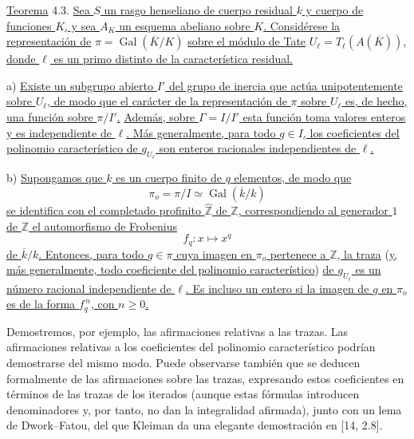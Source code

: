 \par\medskip
\noindent
\underline{Teorema} 4.3. \underline{Sea $S$ un rasgo henseliano de
cuerpo residual $k$ y cuerpo de funciones $K$, y sea $A_K$ un esquema
abeliano sobre $K$. Considérese la representación de}
$\pi=\operatorname{Gal}(\overline K/K)$ \underline{sobre el módulo de
Tate} $U_\ell=T_\ell(A(\overline K))$, \underline{donde $\ell$ es un
primo distinto de la característica residual.}

\smallskip
\noindent
a) \underline{Existe un subgrupo abierto $I'$ del grupo de inercia que
actúa unipotentemente sobre $U_\ell$, de modo que el carácter de la
representación de $\pi$ sobre $U_\ell$ es, de hecho, una función sobre
$\pi/I'$.}
\underline{Además, sobre $\Gamma=I/I'$ esta función toma valores enteros
y es independiente de $\ell$. Más generalmente, para todo $g\in I$,
los coeficientes del polinomio característico de $g_{U_\ell}$ son
enteros racionales independientes de $\ell$.}

\smallskip
\noindent
b) \underline{Supongamos que $k$ es un cuerpo finito de $q$ elementos,
de modo que}
\[
 \pi_o=\pi/I\simeq\operatorname{Gal}(\overline k/k)
\]
\underline{se identifica con el completado profinito
$\widehat{\mathbb Z}$ de $\mathbb Z$, correspondiendo al generador $1$
de $\mathbb Z$ el automorfismo de Frobenius}
\[
 f_q:x\longmapsto x^q
\]
\underline{de $\overline k/k$. Entonces, para todo $g\in\pi$ cuya imagen
en $\pi_o$ pertenece a $\mathbb Z$, la traza} (\underline{y, más generalmente, todo
coeficiente del polinomio característico}) \underline{de $g_{U_\ell}$ es un número
racional independiente de $\ell$. Es incluso un entero si la imagen de
$g$ en $\pi_o$ es de la forma $f_q^{\,n}$, con $n\geq0$.}

Demostremos, por ejemplo, las afirmaciones relativas a las trazas. Las
afirmaciones relativas a los coeficientes del polinomio característico
podrían demostrarse del mismo modo. Puede observarse también que se
deducen formalmente de las afirmaciones sobre las trazas, expresando
estos coeficientes en términos de las trazas de los iterados (aunque
estas fórmulas introducen denominadores y, por tanto, no dan la
integralidad afirmada), junto con un lema de Dwork--Fatou, del que
Kleiman da una elegante demostración en [14, 2.8].

